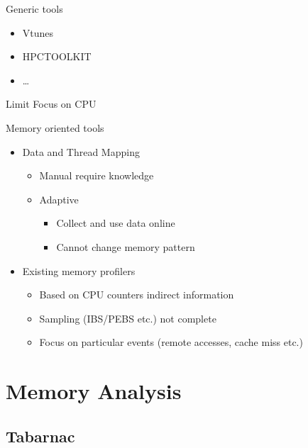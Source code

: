 \documentclass[xcolor={usenames,dvipsnames}]{beamer}
\begin{document}
\begin{frame}{Generic tools}
    \begin{itemize}
        \item Vtunes~\cite{Reinders05VTune}
        \item HPCTOOLKIT~\cite{Adhianto10HPCTOOLKIT}
        \item \ldots
    \end{itemize}
    \pause
    \begin{alertblock}{Limit}
        Focus on CPU
    \end{alertblock}
\end{frame}
\begin{frame}{Memory oriented tools}
    \begin{itemize}[<+->]
        \item Data and Thread Mapping
            \begin{itemize}
                \item Manual \alert{require knowledge}
                \item  Adaptive~\cite{Diener13CommunicationBased,Levinthal2009}
                    \begin{itemize}
                        \item Collect and use data online
                        \item \alert{Cannot change memory pattern}
                    \end{itemize}
            \end{itemize}
        \item Existing memory
            profilers~\cite{Lachaize12MemProf,Gimenez14Dissecting,Liu14Tool}
            \begin{itemize}
                \item Based on CPU counters \alert{indirect information}
                \item Sampling (IBS/PEBS etc.) \alert{not complete}
                \item \alert{Focus on particular events} (remote accesses,
                    cache miss etc.)
            \end{itemize}
    \end{itemize}
\end{frame}
\section{Memory Analysis}
\subsection{Tabarnac}
\end{document}
